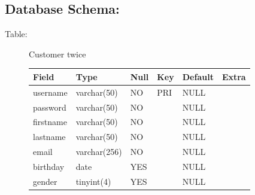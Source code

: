 \subsection{Database Schema:}
\begin{description}
\item[Table:] Customer twice

\begin{center}
    \begin{tabular}{ | l | l | l | l | l | l|}
    \hline
    Field & Type & Null & Key & Default & Extra \\ \hline \hline
    username & varchar(50) & NO & PRI & NULL & \hspace{1 pc} \\ \hline
    password & varchar(50) & NO & \hspace{1 pc} & NULL &\hspace{1 pc}  \\ \hline
    firstname & varchar(50) & NO & \hspace{1 pc}& NULL &\hspace{1 pc}  \\ \hline
    lastname & varchar(50) & NO &\hspace{1 pc} & NULL &\hspace{1 pc}  \\ \hline
    email & varchar(256) & NO &\hspace{1 pc} & NULL &\hspace{1 pc}   \\\hline
    birthday & date & YES &\hspace{1 pc} & NULL & \hspace{1 pc} \\ \hline
    gender & tinyint(4) & YES &\hspace{1 pc} & NULL &\hspace{1 pc}  \\
    \hline
    \end{tabular}
\end{center}


\end{description}
